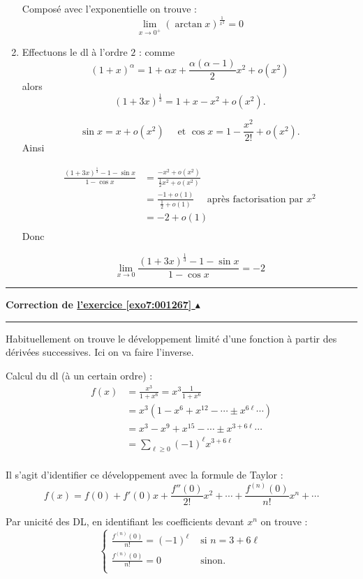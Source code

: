 \documentclass[11pt,a4paper]{article}
\renewcommand{\ge}{\geqslant} \renewcommand{\geq}{\geqslant}
\newcommand{\Arctan}{\mathop{\mathrm{arctan}}\nolimits}
\newcounter{exo}
\newcommand{\correction}[1]{\hypertarget{cor7:#1}{}\label{cor7:#1}{\bf Correction de \hyperlink{exo7:#1}{l'exercice \ref{exo7:#1} $\blacktriangle$}}\vspace{1mm}\hrule\vspace{1mm}}
\newcommand{\fincorrection}{\vspace{1mm}\hrule\vspace*{7mm}}
\begin{document}
\begin{enumerate}
Composé avec l'exponentielle on trouve :
$$\lim_{x \rightarrow 0^+}(\Arctan x )^{\frac{1}{x^2}}=0$$



  \item 
Effectuons le dl à l'ordre $2$ :
comme 
$$(1+x)^\alpha = 1+\alpha x + \frac{\alpha(\alpha-1)}{2}x^2+o(x^2)$$
alors
$$(1+3x)^{\frac{1}{3}} = 1+x-x^2 + o(x^2).$$

$$\sin x = x + o(x^2) \quad \text{ et } \cos x = 1 - \frac{x^2}{2!} + o(x^2).$$
Ainsi

\begin{align*}
\frac{(1+3x)^{\frac{1}{3}}-1-\sin x}{1-\cos x}  
 & = \frac{-x^2+o(x^2)}{\frac12x^2 + o(x^2)} \\
 & = \frac{-1+o(1)}{\frac12 + o(1)} \quad \text{ après factorisation par } x^2 \\
 &= -2 + o(1) \\
\end{align*}
Donc 

$$\lim_{x \rightarrow 0} \frac{(1+3x)^{\frac{1}{3}}-1-\sin x}{1-\cos x}=-2$$

\end{enumerate}
\fincorrection
\correction{001267}
Habituellement on trouve le développement limité d'une fonction 
à partir des dérivées successives. Ici on va faire l'inverse.

Calcul du dl (à un certain ordre) :
\begin{align*}
f(x) & = \frac{x^3}{1+x^6} = x^3 \frac{1}{1+x^6}\\
     & =  x^3 \left( 1-x^6 + x^{12} - \cdots \pm x^{6\ell} \cdots \right) \\
     &= x^3 - x^9 + x^{15} -\cdots \pm x^{3+6\ell} \cdots \\
     &= \sum_{\ell \ge 0} (-1)^\ell x^{3+6\ell} \\
\end{align*}

Il s'agit d'identifier ce développement avec la formule de Taylor :
$$f(x)=f(0)+f'(0)x+\frac{f''(0)}{2!}x^2 + \cdots + \frac{f^{(n)}(0)}{n!} x^n + \cdots$$


Par unicité des DL, en identifiant les coefficients devant $x^n$ on trouve :
$$\begin{cases}
\frac{f^{(n)}(0)}{n!} = (-1)^\ell & \text{ si } n = 3+6\ell \\
\frac{f^{(n)}(0)}{n!} = 0         & \text{ sinon.} \\    
\end{cases}$$
\end{document}

